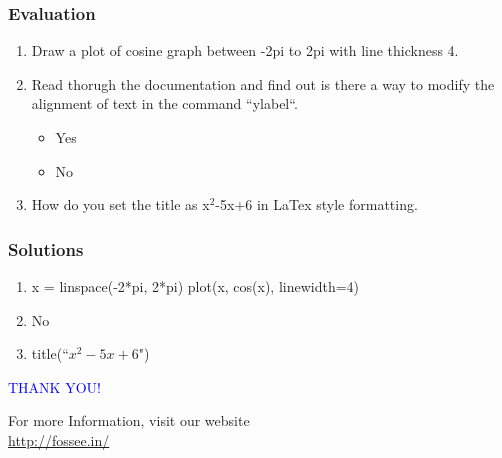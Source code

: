 \documentclass[presentation]{beamer}
\begin{document}
\begin{frame}
\frametitle{Evaluation}
\label{sec-12}


\begin{enumerate}
\item Draw a plot of cosine graph between -2pi to 2pi with line thickness 4.
\item Read thorugh the documentation and find out is there a way to modify the
     alignment of text in the command ``ylabel``.
\begin{itemize}
\item Yes
\item No
\end{itemize}
\item How do you set the title as x$^2$-5x+6 in LaTex style formatting.
\end{enumerate}
\end{frame}
\begin{frame}
\frametitle{Solutions}
\label{sec-13}


\begin{enumerate}
\item x = linspace(-2*pi, 2*pi)
     plot(x, cos(x), linewidth=4)
\item No
\item title(``$x^2-5x+6$")
\end{enumerate}
\end{frame}
\begin{frame}

  \begin{block}{}
  \begin{center}
  \textcolor{blue}{\Large THANK YOU!} 
  \end{center}
  \end{block}
\begin{block}{}
  \begin{center}
    For more Information, visit our website\\
    \url{http://fossee.in/}
  \end{center}  
  \end{block}
\end{frame}
\end{document}
